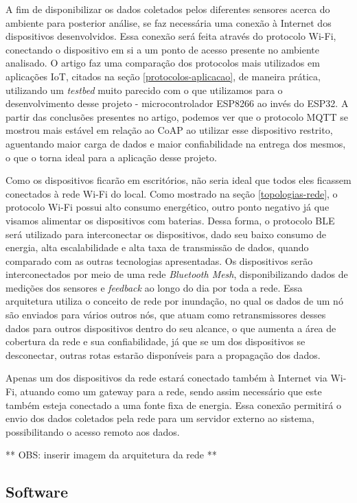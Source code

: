 \documentclass[../monografia.tex]{subfiles}
\begin{document}
A fim de disponibilizar os dados coletados pelos diferentes sensores acerca do ambiente para posterior análise, se faz necessária uma conexão à Internet dos dispositivos desenvolvidos. Essa conexão será feita através do protocolo Wi-Fi, conectando o dispositivo em si a um ponto de acesso presente no ambiente analisado. O artigo \cite{analise-protocolos-iot} faz uma comparação dos protocolos mais utilizados em aplicações IoT, citados na seção \ref{protocolos-aplicacao}, de maneira prática, utilizando um \textit{testbed} muito parecido com o que utilizamos para o desenvolvimento desse projeto - microcontrolador ESP8266 ao invés do ESP32. A partir das conclusões presentes no artigo, podemos ver que o protocolo MQTT se mostrou mais estável em relação ao CoAP ao utilizar esse dispositivo restrito, aguentando maior carga de dados e maior confiabilidade na entrega dos mesmos, o que o torna ideal para a aplicação desse projeto.

Como os dispositivos ficarão em escritórios, não seria ideal que todos eles ficassem conectados à rede Wi-Fi do local. Como mostrado na seção \ref{topologias-rede}, o protocolo Wi-Fi possui alto consumo energético, outro ponto negativo já que visamos alimentar os dispositivos com baterias. Dessa forma, o protocolo BLE será utilizado para interconectar os dispositivos, dado seu baixo consumo de energia, alta escalabilidade e alta taxa de transmissão de dados, quando comparado com as outras tecnologias apresentadas. Os dispositivos serão interconectados por meio de uma rede \textit{Bluetooth Mesh}, disponibilizando dados de medições dos sensores e \textit{feedback} ao longo do dia por toda a rede. Essa arquitetura utiliza o conceito de rede por inundação, no qual os dados de um nó são enviados para vários outros nós, que atuam como retransmissores desses dados para outros dispositivos dentro do seu alcance, o que aumenta a área de cobertura da rede e sua confiabilidade, já que se um dos dispositivos se desconectar, outras rotas estarão disponíveis para a propagação dos dados.

Apenas um dos dispositivos da rede estará conectado também à Internet via Wi-Fi, atuando como um gateway para a rede, sendo assim necessário que este também esteja conectado a uma fonte fixa de energia. Essa conexão permitirá o envio dos dados coletados pela rede para um servidor externo ao sistema, possibilitando o acesso remoto aos dados.


** OBS: inserir imagem da arquitetura da rede ** 

\subsection{Software}
\end{document}
